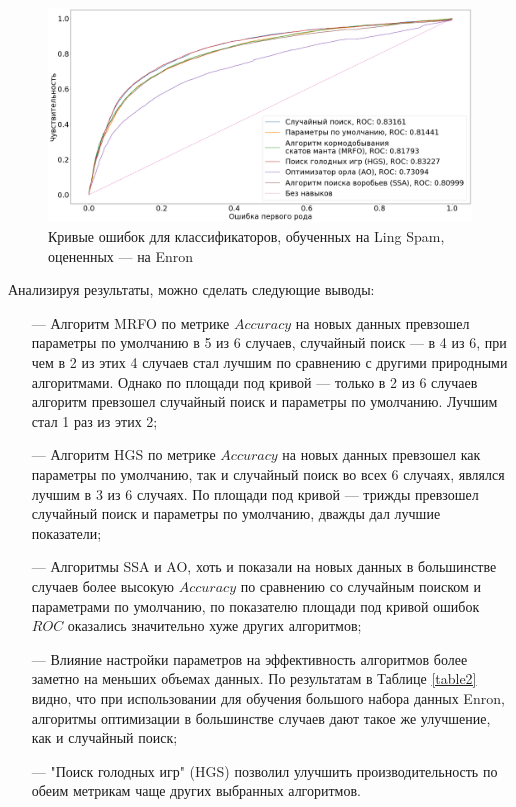 \begin{figure}[H]
    \centering
    \includegraphics[width=165mm]{static/LS-EN.png}
    \caption{Кривые ошибок для классификаторов, обученных на Ling Spam, оцененных — на Enron}
    \label{LS-EN}
\end{figure}

Анализируя результаты, можно сделать следующие выводы:

\begin{itemize}
    \item[—] Алгоритм MRFO по метрике $Accuracy$ на новых данных превзошел параметры по умолчанию в 5 из 6 случаев,
    случайный поиск — в 4 из 6, при чем в 2 из этих 4 случаев стал лучшим по сравнению с другими природными алгоритмами.
    Однако по площади под кривой — только в 2 из 6 случаев алгоритм превзошел случайный поиск и параметры по умолчанию.  
    Лучшим стал 1 раз из этих 2;
    
    \item[—] Алгоритм HGS по метрике $Accuracy$ на новых данных превзошел как параметры по умолчанию, так и 
    случайный поиск во всех 6 случаях, являлся лучшим в 3 из 6 случаях.
    По площади под кривой — трижды превзошел случайный поиск и параметры по умолчанию, дважды дал лучшие показатели;

    \item[—] Алгоритмы SSA и AO, хоть и показали на новых данных в большинстве случаев 
    более высокую $Accuracy$ по сравнению со случайным поиском и параметрами по умолчанию, по показателю площади 
    под кривой ошибок $ROC$ оказались значительно хуже других алгоритмов;

    \item[—] Влияние настройки параметров на эффективность алгоритмов более заметно на меньших объемах данных. 
    По результатам в Таблице \ref{table2} видно, что при использовании для обучения большого набора данных Enron, 
    алгоритмы оптимизации в большинстве случаев дают такое же улучшение, как и случайный поиск;
    
    \item[—] "Поиск голодных игр" (HGS) позволил улучшить производительность по обеим метрикам чаще других выбранных  
    алгоритмов.
\end{itemize}
